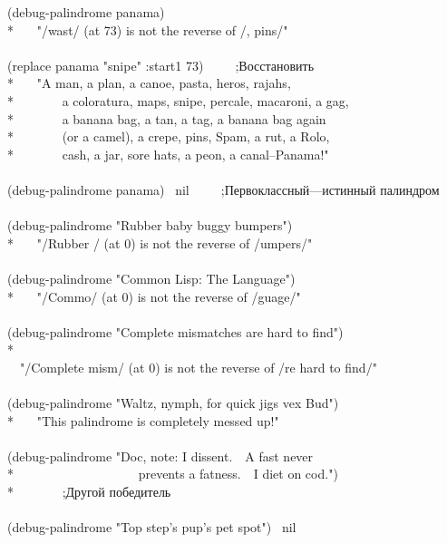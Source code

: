 \begin{lisp}
(debug-palindrome panama) \\*
~~\EV\ "/wast/ (at 73) is not the reverse of /, pins/" \\
\\
(replace panama "snipe" :start1 73)~~~~~;\textrm{Восстановить} \\*
~~\EV\ "A man, a plan, a canoe, pasta, heros, rajahs, \\*
~~~~~~~a coloratura, maps, snipe, percale, macaroni, a gag, \\*
~~~~~~~a banana bag, a tan, a tag, a banana bag again \\*
~~~~~~~(or a camel), a crepe, pins, Spam, a rut, a Rolo, \\*
~~~~~~~cash, a jar, sore hats, a peon, a canal--Panama!" \\
\\
(debug-palindrome panama) \EV\ nil~~~~~;\textrm{Первоклассный---истинный палиндром} \\
\\
(debug-palindrome "Rubber baby buggy bumpers") \\*
~~\EV\ "/Rubber / (at 0) is not the reverse of /umpers/" \\
\\
(debug-palindrome "Common Lisp: The Language") \\*
~~\EV\ "/Commo/ (at 0) is not the reverse of /guage/" \\
\\
(debug-palindrome "Complete mismatches are hard to find") \\*
~~\EV\ \\
~~"/Complete mism/ (at 0) is not the reverse of /re hard to find/" \\
\\
(debug-palindrome "Waltz, nymph, for quick jigs vex Bud") \\*
~~\EV\ "This palindrome is completely messed up!" \\
\\
(debug-palindrome "Doc, note: I dissent.~~A fast never \\*
~~~~~~~~~~~~~~~~~~~prevents a fatness.~~I diet on cod.") \\*
~~\EV\nil~~~~~;\textrm{Другой победитель} \\
\\
(debug-palindrome "Top step's pup's pet spot") \EV\ nil
\end{lisp}

